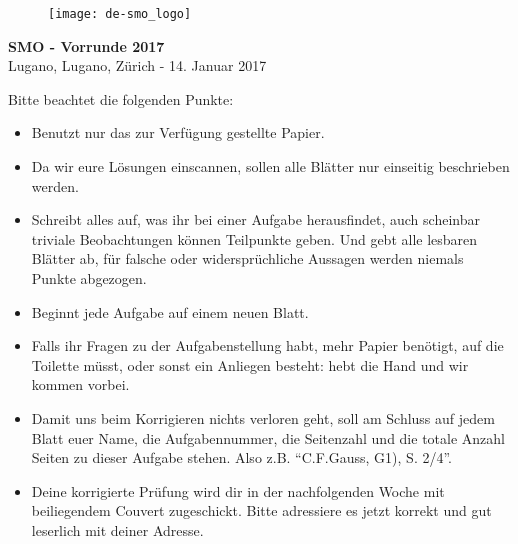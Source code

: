 \documentclass[12pt,a4paper]{article}
\begin{document}
\thispagestyle{empty}
\begin{figure}[h]
\texttt{[image: de-smo\_logo]}
\end{figure}

\vspace{1cm}

\begin{center}
\Huge{\textbf{SMO - Vorrunde 2017}}\\[1.5cm]
\large{Lugano, Lugano, Zürich - 14. Januar 2017}\\[2.5cm]
\end{center}


Bitte beachtet die folgenden Punkte:

\begin{itemize}
\item Benutzt nur das zur Verfügung gestellte Papier.

\item Da wir eure Lösungen einscannen, sollen alle Blätter nur einseitig beschrieben werden. 

\item Schreibt alles auf, was ihr bei einer Aufgabe herausfindet, auch scheinbar triviale Beobachtungen können Teilpunkte geben. Und gebt alle lesbaren Blätter ab, für falsche oder widersprüchliche Aussagen werden niemals Punkte abgezogen.

\item Beginnt jede Aufgabe auf einem neuen Blatt.


\item Falls ihr Fragen zu der Aufgabenstellung habt, mehr Papier benötigt, auf die Toilette müsst, oder sonst ein Anliegen besteht: hebt die Hand und wir kommen vorbei.


\item Damit uns beim Korrigieren nichts verloren geht, soll am Schluss auf jedem Blatt euer Name, die Aufgabennummer, die Seitenzahl und die totale Anzahl Seiten zu dieser Aufgabe stehen. Also z.B. "`C.F.Gauss, G1), S. 2/4"'.

\item Deine korrigierte Prüfung wird dir in der nachfolgenden Woche mit beiliegendem Couvert zugeschickt. Bitte adressiere es jetzt korrekt und gut leserlich mit deiner Adresse.
\end{itemize}
\end{document}
